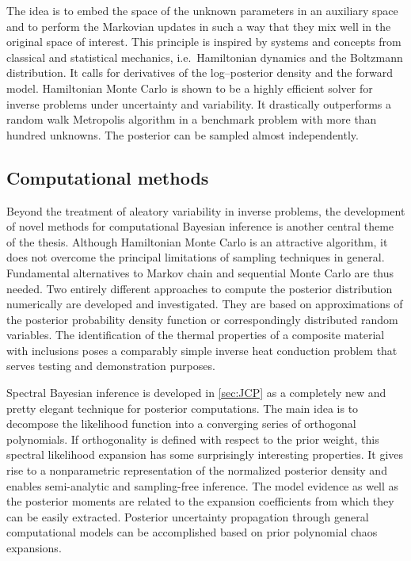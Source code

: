 \begin{refsection}
The idea is to embed the space of the unknown parameters in an auxiliary space and to perform the Markovian updates in such a way that they mix well in the original space of interest.
This principle is inspired by systems and concepts from classical and statistical mechanics, i.e.\ Hamiltonian dynamics and the Boltzmann distribution.
It calls for derivatives of the log--posterior density and the forward model.
Hamiltonian Monte Carlo is shown to be a highly efficient solver for inverse problems under uncertainty and variability.
It drastically outperforms a random walk Metropolis algorithm in a benchmark problem with more than hundred unknowns.
The posterior can be sampled almost independently.

\subsection{Computational methods}
Beyond the treatment of aleatory variability in inverse problems, the development of novel methods for computational Bayesian inference is another central theme of the thesis.
Although Hamiltonian Monte Carlo is an attractive algorithm, it does not overcome the principal limitations of sampling techniques in general.
Fundamental alternatives to Markov chain and sequential Monte Carlo are thus needed.
Two entirely different approaches to compute the posterior distribution numerically are developed and investigated.
They are based on approximations of the posterior probability density function or correspondingly distributed random variables.
The identification of the thermal properties of a composite material with inclusions poses a comparably simple inverse heat conduction problem that serves testing and demonstration purposes.
\par %
Spectral Bayesian inference is developed in \cref{sec:JCP} as a completely new and pretty elegant technique for posterior computations.
The main idea is to decompose the likelihood function into a converging series of orthogonal polynomials.
If orthogonality is defined with respect to the prior weight, this spectral likelihood expansion has some surprisingly interesting properties.
It gives rise to a nonparametric representation of the normalized posterior density and enables semi-analytic and sampling-free inference.
The model evidence as well as the posterior moments are related to the expansion coefficients from which they can be easily extracted.
Posterior uncertainty propagation through general computational models can be accomplished based on prior polynomial chaos expansions.

\end{refsection}
